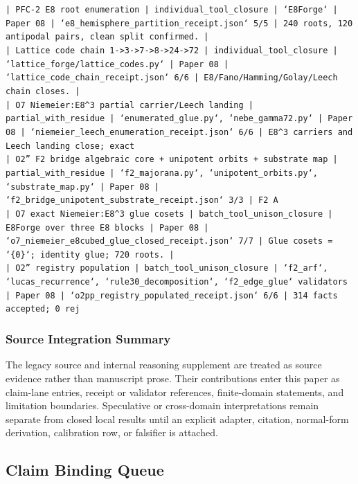 \documentclass[11pt]{article}
\begin{document}
\noindent\texttt{| PFC-2 E8 root enumeration | individual\_tool\_closure | `E8Forge` | Paper 08 | `e8\_hemisphere\_partition\_receipt.json` 5/5 | 240 roots, 120 antipodal pairs, clean split confirmed. |}\\
\noindent\texttt{| Lattice code chain 1->3->7->8->24->72 | individual\_tool\_closure | `lattice\_forge/lattice\_codes.py` | Paper 08 | `lattice\_code\_chain\_receipt.json` 6/6 | E8/Fano/Hamming/Golay/Leech chain closes. |}\\
\noindent\texttt{| O7 Niemeier:E8\textasciicircum{}3 partial carrier/Leech landing | partial\_with\_residue | `enumerated\_glue.py`, `nebe\_gamma72.py` | Paper 08 | `niemeier\_leech\_enumeration\_receipt.json` 6/6 | E8\textasciicircum{}3 carriers and Leech landing close; exact }\\
\noindent\texttt{| O2'' F2 bridge algebraic core + unipotent orbits + substrate map | partial\_with\_residue | `f2\_majorana.py`, `unipotent\_orbits.py`, `substrate\_map.py` | Paper 08 | `f2\_bridge\_unipotent\_substrate\_receipt.json` 3/3 | F2 A}\\
\noindent\texttt{| O7 exact Niemeier:E8\textasciicircum{}3 glue cosets | batch\_tool\_unison\_closure | E8Forge over three E8 blocks | Paper 08 | `o7\_niemeier\_e8cubed\_glue\_closed\_receipt.json` 7/7 | Glue cosets = `\{0\}`; identity glue; 720 roots. |}\\
\noindent\texttt{| O2'' registry population | batch\_tool\_unison\_closure | `f2\_arf`, `lucas\_recurrence`, `rule30\_decomposition`, `f2\_edge\_glue` validators | Paper 08 | `o2pp\_registry\_populated\_receipt.json` 6/6 | 314 facts accepted; 0 rej}\\

\subsubsection*{Source Integration Summary}

The legacy source and internal reasoning supplement are treated as source
evidence rather than manuscript prose. Their contributions enter this paper as
claim-lane entries, receipt or validator references, finite-domain statements,
and limitation boundaries. Speculative or cross-domain interpretations remain
separate from closed local results until an explicit adapter, citation,
normal-form derivation, calibration row, or falsifier is attached.
\subsection*{Claim Binding Queue}
\end{document}
